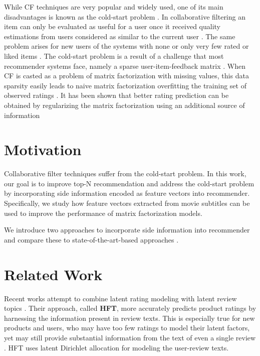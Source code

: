 While CF techniques are very popular and widely used, one of its main disadvantages is known as the cold-start problem \cite{Christoffel2014}.
In collaborative filtering an item can only be evaluated as useful for a user once it received quality estimations from users considered as similar to the current user \cite{Christoffel2014}.
The same problem arises for new users of the systems with none or only very few rated or liked items \cite{Christoffel2014}.
The cold-start problem is a result of a challenge that most recommender systems face, namely a sparse user-item-feedback matrix \cite{Christoffel2014}.
When CF is casted as a problem of matrix factorization with missing values, this data sparsity easily leads to naive matrix factorization overfitting the training set of observed ratings \cite{Almahairi2015,Ilin2010}.
It has been shown that better rating prediction can be obtained by regularizing the matrix factorization using an additional source of information \cite{McAuley2013,Bao2014,Almahairi2015}


\section{Motivation}
\label{st:motivation}

Collaborative filter techniques suffer from the cold-start problem.
In this work, our goal is to improve top-N recommendation and address the cold-start problem by incorporating side information encoded as feature vectors into recommender.
Specifically, we study how feature vectors extracted from movie subtitles can be used to improve the performance of matrix factorization models.

We introduce two approaches to incorporate side information into recommender and compare these to state-of-the-art-based approaches \cite{Kabbur2015,Ning2011,Rendle2009}.


\section{Related Work}
\label{st:related-work}

Recent works attempt to combine latent rating modeling with latent review topics \cite{McAuley2013}.
Their approach, called \textbf{HFT}, more accurately predicts product ratings by harnessing the information present in review texts.
This is especially true for new products and users, who may have too few ratings to model their latent factors, yet may still provide substantial information from the text of even a single review \cite{McAuley2013}.
HFT uses latent Dirichlet allocation for modeling the user-review texts.

